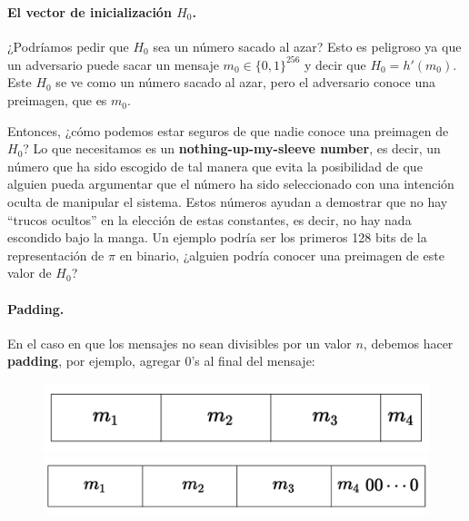 \paragraph{El vector de inicialización $H_0$.} ¿Podríamos pedir que $H_0$ sea un número sacado al azar? Esto es peligroso ya que un adversario puede sacar un mensaje $m_0 \in \{0,1\}^{256}$ y decir que $H_0 = h'(m_0)$. Este $H_0$ se ve como un número sacado al azar, pero el adversario conoce una preimagen, que es $m_0$. \medbreak

Entonces, ¿cómo podemos estar seguros de que nadie conoce una preimagen de $H_0$? Lo que necesitamos es un \textbf{nothing-up-my-sleeve number}, es decir, un número que ha sido escogido de tal manera que evita la posibilidad de que alguien pueda argumentar que el número ha sido seleccionado con una intención oculta de manipular el sistema. Estos números ayudan a demostrar que no hay ``trucos ocultos'' en la elección de estas constantes, es decir, no hay nada escondido bajo la manga. Un ejemplo podría ser los primeros 128 bits de la representación de $\pi$ en binario, ¿alguien podría conocer una preimagen de este valor de $H_0$?

\paragraph{Padding.} En el caso en que los mensajes no sean divisibles por un valor $n$, debemos hacer \textbf{padding}, por ejemplo, agregar 0's al final del mensaje:
\begin{figure}[H]
\centering
\includegraphics[scale=0.4]{img/cap5/4.png}
\includegraphics[scale=0.4]{img/cap5/5.png}
\end{figure}

